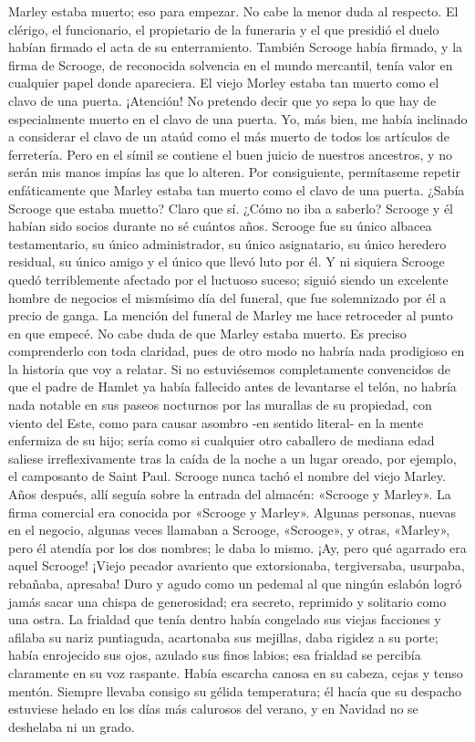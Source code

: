 \documentclass{novela}
\begin{document}
 Marley estaba muerto; eso para empezar. No cabe la menor duda al respecto. El clérigo, el funcionario, el propietario de la funeraria y el que presidió el duelo habían firmado el acta de su enterramiento. También Scrooge había firmado, y la firma de Scrooge, de reconocida solvencia en el mundo mercantil, tenía valor en cualquier papel donde apareciera. El viejo Morley estaba tan muerto como el clavo de una puerta.
 ¡Atención! No pretendo decir que yo sepa lo que hay de especialmente muerto en el clavo de una puerta. Yo, más bien, me había inclinado a considerar el clavo de un ataúd como el más muerto de todos los artículos de ferretería. Pero en el símil se contiene el buen juicio de nuestros ancestros, y no serán mis manos impías las que lo alteren. Por consiguiente, permítaseme repetir enfáticamente que Marley estaba tan muerto como el clavo de una puerta.
 ¿Sabía Scrooge que estaba muetto? Claro que sí. ¿Cómo no iba a saberlo? Scrooge y él habían sido socios durante no sé cuántos años. Scrooge fue su único albacea testamentario, su único administrador, su único asignatario, su único heredero residual, su único amigo y el único que llevó luto por él. Y ni siquiera Scrooge quedó terriblemente afectado por el luctuoso suceso; siguió siendo un excelente hombre de negocios el mismísimo día del funeral, que fue solemnizado por él a precio de ganga.
 La mención del funeral de Marley me hace retroceder al punto en que empecé. No cabe duda de que Marley estaba muerto. Es preciso comprenderlo con toda claridad, pues de otro modo no habría nada prodigioso en la historia que voy a relatar. Si no estuviésemos completamente convencidos de que el padre de Hamlet ya había fallecido antes de levantarse el telón, no habría nada notable en sus paseos nocturnos por las murallas de su propiedad, con viento del Este, como para causar asombro -en sentido literal- en la mente enfermiza de su hijo; sería como si cualquier otro caballero de mediana edad saliese irreflexivamente tras la caída de la noche a un lugar oreado, por ejemplo, el camposanto de Saint Paul.
 Scrooge nunca tachó el nombre del viejo Marley. Años después, allí seguía sobre la entrada del almacén: «Scrooge y Marley». La firma comercial era conocida por «Scrooge y Marley».  Algunas personas, nuevas en el negocio, algunas veces llamaban a Scrooge, «Scrooge», y otras, «Marley», pero él atendía por los dos nombres; le daba lo mismo.
 ¡Ay, pero qué agarrado era aquel Scrooge! ¡Viejo pecador avariento que extorsionaba, tergiversaba, usurpaba, rebañaba, apresaba! Duro y agudo como un pedemal al que ningún eslabón logró jamás sacar una chispa de generosidad; era secreto, reprimido y solitario como una ostra. La frialdad que tenía dentro había congelado sus viejas facciones y afilaba su nariz puntiaguda, acartonaba sus mejillas, daba rigidez a su porte; había enrojecido sus ojos, azulado sus finos labios; esa frialdad se percibía claramente en su voz raspante. Había escarcha canosa en su cabeza, cejas y tenso mentón. Siempre llevaba consigo su gélida temperatura; él hacía que su despacho estuviese helado en los días más calurosos del verano, y en Navidad no se deshelaba ni un grado.
\end{document}
